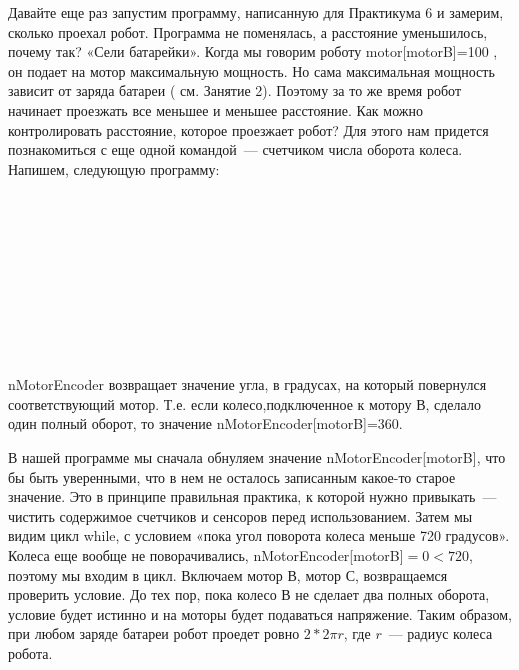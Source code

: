 Давайте еще раз запустим программу, написанную для Практикума 6 и замерим, сколько проехал робот. Программа не поменялась, а расстояние уменьшилось, почему так?  «Сели батарейки». Когда мы говорим роботу motor[motorB]=100 , он подает на мотор максимальную мощность. Но сама максимальная мощность зависит от заряда батареи ( см. Занятие 2). Поэтому за то же время робот начинает проезжать все меньшее и меньшее расстояние. Как можно контролировать расстояние, которое проезжает робот? Для этого нам придется познакомиться с еще одной командой~--- счетчиком числа оборота колеса. Напишем, следующую программу:
\clearpage
{\programm
	{\slshape{}}\rC{()}\\
	\rC{\{}\\
	\indent{}\\
	\\
	\indent\rC{\{}\\
	\indent\indent{}\\
	\indent\indent{}\\
	\indent\rC{\}}\\
	\rC{\}}\\
}\\\\

nMotorEncoder возвращает значение угла, в градусах, на который повернулся соответствующий мотор. Т.е. если колесо,подключенное к мотору В, сделало один полный оборот, то значение nMotorEncoder[motorB]=360.

В нашей программе мы сначала обнуляем значение  nMotorEncoder[motorB], что бы быть уверенными, что в нем не осталось записанным какое-то старое значение. Это в принципе правильная практика, к которой нужно привыкать~--- чистить содержимое счетчиков и сенсоров перед использованием. Затем мы видим цикл while, с условием «пока угол поворота колеса меньше 720 градусов». Колеса еще вообще не поворачивались, nMotorEncoder[motorB]\(=0<720\), поэтому мы входим в цикл. Включаем мотор В, мотор С, возвращаемся проверить условие. До тех пор, пока колесо В не сделает два полных оборота, условие будет истинно и на моторы будет подаваться напряжение. Таким образом, при любом заряде батареи робот проедет ровно \(2*2\pi r\), где \(r\)~--- радиус колеса робота.\\\\

